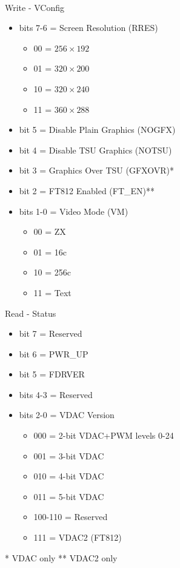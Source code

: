\\
Write - VConfig
\begin{itemize}
\item bits 7-6 = Screen Resolution (RRES)
  \begin{itemize}
  \item 00 = $256\times192$
  \item 01 = $320\times200$
  \item 10 = $320\times240$
  \item 11 = $360\times288$
  \end{itemize}
\item bit 5 = Disable Plain Graphics (NOGFX)
\item bit 4 = Disable TSU Graphics (NOTSU)
\item bit 3 = Graphics Over TSU (GFXOVR)*
\item bit 2 = FT812 Enabled (FT\_EN)**
\item bits 1-0 = Video Mode (VM)
  \begin{itemize}
  \item 00 = ZX
  \item 01 = 16c
  \item 10 = 256c
  \item 11 = Text
  \end{itemize}
\end{itemize}
Read - Status
\begin{itemize}
\item bit 7 = Reserved
\item bit 6 = PWR\_UP
\item bit 5 = FDRVER
\item bits 4-3 = Reserved
\item bits 2-0 = VDAC Version
  \begin{itemize}
  \item 000 = 2-bit VDAC+PWM levels 0-24
  \item 001 = 3-bit VDAC
  \item 010 = 4-bit VDAC
  \item 011 = 5-bit VDAC
  \item 100-110 = Reserved
  \item 111 = VDAC2 (FT812)
  \end{itemize}
\end{itemize}
* VDAC only
** VDAC2 only

